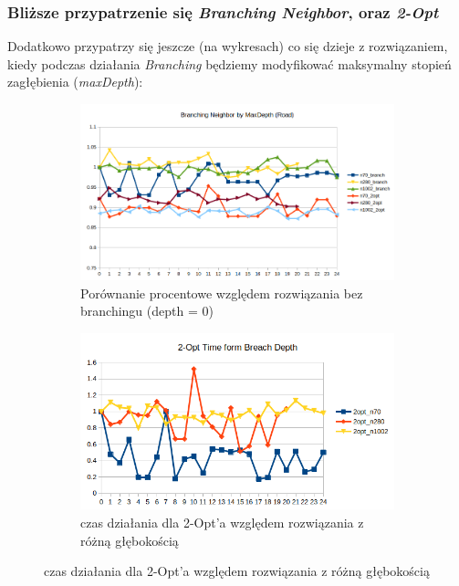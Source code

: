 \documentclass{article}
\begin{document}
\subsubsection{Bliższe przypatrzenie się \textit{Branching Neighbor}, oraz \textit{2-Opt}}
Dodatkowo przypatrzy się jeszcze (na wykresach) co się dzieje z rozwiązaniem, kiedy podczas działania \textit{Branching} będziemy modyfikować maksymalny stopień zagłębienia (\textit{maxDepth}):
\begin{figure}[h!]
 	\centering
 	\begin{subfigure}[b]{0.9\linewidth}
    	\includegraphics[width=\linewidth]{branch_roads_perc.png}
    	\caption{Porównanie procentowe względem rozwiązania bez branchingu (depth = 0)}
	\end{subfigure}
 	\begin{subfigure}[b]{0.9\linewidth}
    	\includegraphics[width=\linewidth]{branch_times_2Opt.png}
    	\caption{czas działania dla 2-Opt'a względem rozwiązania z różną głębokością}
	\end{subfigure}
\end{figure}
\end{document}
